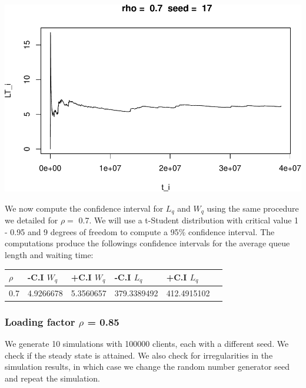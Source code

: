 \documentclass[]{article}
\begin{document}
\includegraphics{003_files/figure-latex/unnamed-chunk-17-10.pdf}

We now compute the confidence interval for \(L_{q}\) and \(W_{q}\) using
the same procedure we detailed for \(\rho =\) 0.7. We will use a
t-Student distribution with critical value 1 - 0.95 and 9 degrees of
freedom to compute a 95\% confidence interval. The computations produce
the followings confidence intervals for the average queue length and
waiting time:

\begin{longtable}[]{@{}llllll@{}}
\toprule
\(\rho\) & -C.I \(W_{q}\) & +C.I \(W_{q}\) & -C.I \(L_{q}\) & +C.I
\(L_{q}\) &\tabularnewline
\midrule
\endhead
0.7 & 4.9266678 & 5.3560657 & 379.3389492 & 412.4915102\tabularnewline
\bottomrule
\end{longtable}

\subsubsection{\texorpdfstring{Loading factor \(\rho\) =
0.85}{Loading factor \textbackslash{}rho = 0.85}}\label{loading-factor-rho-0.85}

We generate 10 simulations with 100000 clients, each with a different
seed. We check if the steady state is attained. We also check for
irregularities in the simulation results, in which case we change the
random number generator seed and repeat the simulation.
\end{document}
